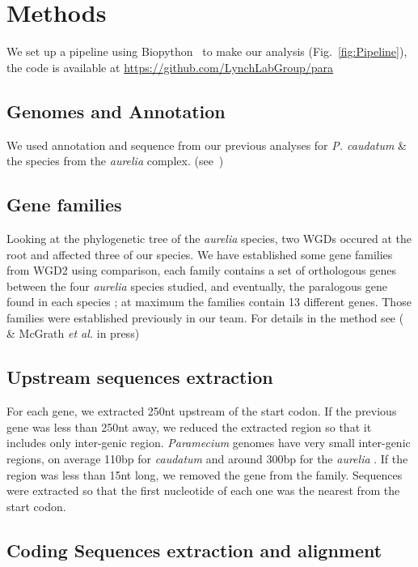 \section*{Methods}
\label{sec:Methods}

We set up a pipeline using Biopython~\citep{cock_biopython:_2009} to make our analysis (Fig.~\ref{fig:Pipeline}), the code is available at \url{https://github.com/LynchLabGroup/para}

\subsection*{Genomes and Annotation}

We used annotation and sequence from our previous analyses for \textit{P. caudatum} \& the species from the \textit{aurelia} complex. (see~\citealt{mcgrath_insights_2014})

\subsection*{Gene families}

Looking at the phylogenetic tree of the \textit{aurelia} species, two WGDs occured at the root and affected three of our species. We have established some gene families from WGD2 using comparison, each family contains a set of orthologous genes between the four \textit{aurelia} species studied, and eventually, the paralogous gene found in each species ; at maximum the families contain 13 different genes. Those families were established previously in our team. For details in the method see (\citealt{mcgrath_insights_2014} \& McGrath \textit{et al.} in press)

\subsection*{Upstream sequences extraction}

For each gene, we extracted 250nt upstream of the start codon. If the previous gene was less than 250nt away, we reduced the extracted region so that it includes only inter-genic region. \textit{Paramecium} genomes have very small inter-genic regions, on average 110bp for \textit{caudatum} and around 300bp for the \textit{aurelia} \citep{mcgrath_insights_2014}.  If the region was less than 15nt long, we removed the gene from the family. Sequences were extracted so that the first nucleotide of each one was the nearest from the start codon.

\subsection*{Coding Sequences extraction and alignment}

